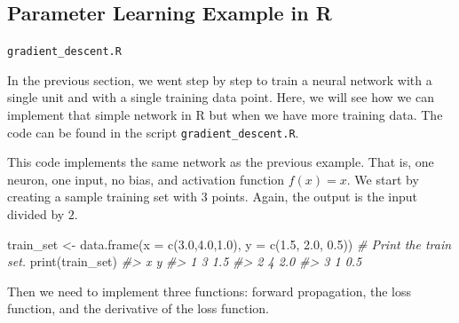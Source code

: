 \documentclass[
  11pt,
]{krantz}
\makeatletter
\newenvironment{Shaded}{\begin{snugshade}}{\end{snugshade}}
\newcommand{\AttributeTok}[1]{\textcolor[rgb]{0.61,0.61,0.61}{#1}}
\newcommand{\CommentTok}[1]{\textcolor[rgb]{0.37,0.37,0.37}{\textit{#1}}}
\newcommand{\FloatTok}[1]{\textcolor[rgb]{0.06,0.06,0.06}{#1}}
\newcommand{\FunctionTok}[1]{\textcolor[rgb]{0,0,0}{#1}}
\newcommand{\NormalTok}[1]{#1}
\newcommand{\OtherTok}[1]{\textcolor[rgb]{0.37,0.37,0.37}{#1}}
\newenvironment{kframe}{%
\medskip{}
\setlength{\fboxsep}{.8em}
 \def\at@end@of@kframe{}%
 \ifinner\ifhmode%
  \def\at@end@of@kframe{\end{minipage}}%
  \begin{minipage}{\columnwidth}%
 \fi\fi%
 \def\FrameCommand##1{\hskip\@totalleftmargin \hskip-\fboxsep
 \colorbox{shadecolor}{##1}\hskip-\fboxsep
     \hskip-\linewidth \hskip-\@totalleftmargin \hskip\columnwidth}%
 \MakeFramed {\advance\hsize-\width
   \@totalleftmargin\z@ \linewidth\hsize
   \@setminipage}}%
 {\par\unskip\endMakeFramed%
 \at@end@of@kframe}
\newenvironment{rmdblock}[1]
  {
  \begin{itemize}
  \renewcommand{\labelitemi}{
    \raisebox{-.7\height}[0pt][0pt]{
      {\setkeys{Gin}{width=3em,keepaspectratio}\texttt{[image: images/icons/\#1]}}
    }
  }
  \setlength{\fboxsep}{1em}
  \begin{kframe}
  \item
  }
  {
  \end{kframe}
  \end{itemize}
  }
\newenvironment{rmdfolder}
  {\begin{rmdblock}{folder}}
  {\end{rmdblock}}
\makeatother
\begin{document}
\hypertarget{parameter-learning-example-in-r}{%
\subsection{Parameter Learning Example in R}\label{parameter-learning-example-in-r}}

\begin{rmdfolder}
\texttt{gradient\_descent.R}
\end{rmdfolder}

In the previous section, we went step by step to train a neural network with a single unit and with a single training data point. Here, we will see how we can implement that simple network in R but when we have more training data. The code can be found in the script \texttt{gradient\_descent.R}.

This code implements the same network as the previous example. That is, one neuron, one input, no bias, and activation function \(f(x) = x\). We start by creating a sample training set with \(3\) points. Again, the output is the input divided by \(2\).

\begin{Shaded}
\begin{Highlighting}[]
\NormalTok{train\_set }\OtherTok{\textless{}{-}} \FunctionTok{data.frame}\NormalTok{(}\AttributeTok{x =} \FunctionTok{c}\NormalTok{(}\FloatTok{3.0}\NormalTok{,}\FloatTok{4.0}\NormalTok{,}\FloatTok{1.0}\NormalTok{), }\AttributeTok{y =} \FunctionTok{c}\NormalTok{(}\FloatTok{1.5}\NormalTok{, }\FloatTok{2.0}\NormalTok{, }\FloatTok{0.5}\NormalTok{))}
\CommentTok{\# Print the train set.}
\FunctionTok{print}\NormalTok{(train\_set)}
\CommentTok{\#\textgreater{}   x   y}
\CommentTok{\#\textgreater{} 1 3 1.5}
\CommentTok{\#\textgreater{} 2 4 2.0}
\CommentTok{\#\textgreater{} 3 1 0.5}
\end{Highlighting}
\end{Shaded}

Then we need to implement three functions: forward propagation, the loss function, and the derivative of the loss function.
\end{document}
